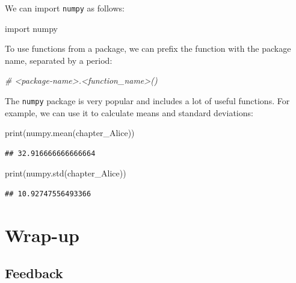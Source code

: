 \documentclass[
]{book}
\newenvironment{Shaded}{\begin{snugshade}}{\end{snugshade}}
\newcommand{\BuiltInTok}[1]{#1}
\newcommand{\CommentTok}[1]{\textcolor[rgb]{0.56,0.35,0.01}{\textit{#1}}}
\newcommand{\ImportTok}[1]{#1}
\newcommand{\NormalTok}[1]{#1}
\begin{document}
We can import \texttt{numpy} as follows:

\begin{Shaded}
\begin{Highlighting}[]
\ImportTok{import}\NormalTok{ numpy}
\end{Highlighting}
\end{Shaded}

To use functions from a package, we can prefix the function with the package name, separated by a period:

\begin{Shaded}
\begin{Highlighting}[]
\CommentTok{\# \textless{}package{-}name\textgreater{}.\textless{}function\_name\textgreater{}()}
\end{Highlighting}
\end{Shaded}

The \texttt{numpy} package is very popular and includes a lot of useful functions. For example, we can use it to calculate means and standard deviations:

\begin{Shaded}
\begin{Highlighting}[]
\BuiltInTok{print}\NormalTok{(numpy.mean(chapter\_Alice))}
\end{Highlighting}
\end{Shaded}

\begin{verbatim}
## 32.916666666666664
\end{verbatim}

\begin{Shaded}
\begin{Highlighting}[]
\BuiltInTok{print}\NormalTok{(numpy.std(chapter\_Alice))}
\end{Highlighting}
\end{Shaded}

\begin{verbatim}
## 10.92747556493366
\end{verbatim}

\hypertarget{wrap-up-5}{%
\section{Wrap-up}\label{wrap-up-5}}

\hypertarget{feedback-5}{%
\subsection{Feedback}\label{feedback-5}}
\end{document}
